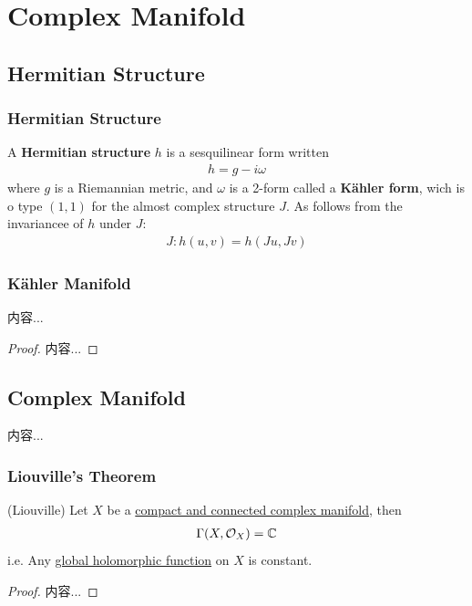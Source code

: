 \documentclass[Total.tex]{subfiles}
\begin{document}
		\section{Complex Manifold}
			\subsection{Hermitian Structure}
				\subsubsection{Hermitian Structure}
				\begin{Def}
					A \textbf{Hermitian structure} $h$ is a sesquilinear form written
					\begin{gather*}
						h=g-i\omega
					\end{gather*}
					where $g$ is a Riemannian metric, and $\omega$ is a 2-form called a \textbf{Kähler form}, wich is o type $(1,1)$ for the almost complex structure $J$. As follows from the invariancee of $h$ under $J$:
					\begin{gather*}
						J:h(u,v)=h(Ju,Jv)
					\end{gather*}
				\end{Def}
				\subsubsection{Kähler Manifold}
				
				\begin{theorem}
					内容...
				\end{theorem}
				\begin{proof}
					内容...
				\end{proof}
			\subsection{Complex Manifold}
				\begin{Def}
					内容...
				\end{Def}
				\subsubsection{Liouville's Theorem}
					\begin{theorem}
						(Liouville) Let $X$ be a \underline{compact and connected complex manifold}, then
						\begin{gather*}
							\Gamma(X,\mathcal{O}_X)=\mathbb{C}
						\end{gather*}
						i.e. Any \underline{global holomorphic function} on $X$ is constant.
					\end{theorem}
					\begin{proof}
						内容...
					\end{proof}
					
\end{document}
